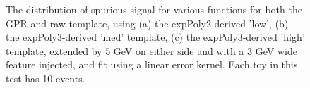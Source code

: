 \begin{figure} 
\begin{center}

\caption{The distribution of spurious signal for various functions for both the GPR and raw template, using (a) the expPoly2-derived 'low', (b) the expPoly3-derived 'med' template, (c) the expPoly3-derived 'high' template, extended by 5 GeV on either side and with a 3 GeV wide feature injected, and fit using a linear error kernel. Each toy in this test has 10 events.}
\label{fig:linearkernel_lowpt_10_Sig}
\end{center}
\end{figure}

